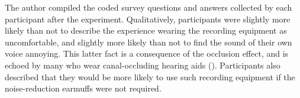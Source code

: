 The author compiled the coded survey questions %
and answers collected by each participant after the experiment. %
Qualitatively, participants were slightly more likely than not to describe the experience wearing the recording equipment as uncomfortable, and slightly more likely than not to find the sound of their own voice annoying.  This latter fact is a consequence of the occlusion effect, and is echoed by many who wear canal-occluding hearing aids (\cite{hansen:97a}).  Participants also described that they would be more likely to use such recording equipment if the noise-reduction   earmuffs were not required.


